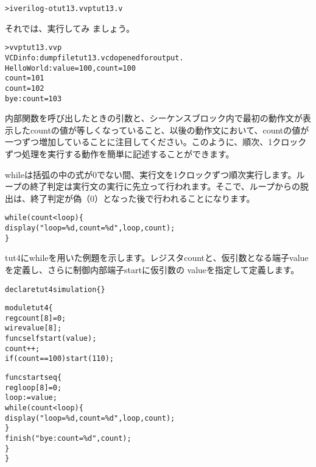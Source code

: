 \begin{reviewcmd}
\begin{alltt}
\textgreater{} iverilog -o tut13.vvp tut13.v
\end{alltt}
\end{reviewcmd}

それでは、実行してみ ましょう。

\begin{reviewcmd}
\begin{alltt}
\textgreater{} vvp tut13.vvp
VCD info: dumpfile tut13.vcd opened for output.
Hello World: value = 100, count = 100
count = 101
count = 102
bye: count = 103
\end{alltt}
\end{reviewcmd}

内部関数を呼び出したときの引数と、シーケンスブロック内で最初の動作文が表示したcountの値が等しくなっていること、以後の動作文において、countの値が一つずつ増加していることに注目してください。このように、順次、1クロックずつ処理を実行する動作を簡単に記述することができます。

whileは括弧の中の式が0でない間、実行文を1クロックずつ順次実行します。ループの終了判定は実行文の実行に先立って行われます。そこで、ループからの脱出は、終了判定が偽（0）となった後で行われることになります。

\begin{reviewemlist}
\begin{alltt}
       while(count\textless{}loop) \{
            \textunderscore{}display("loop = \%d, count = \%d", loop, count);
       \}
\end{alltt}
\end{reviewemlist}

tut4にwhileを用いた例題を示します。レジスタcountと、仮引数となる端子valueを定義し、さらに制御内部端子startに仮引数の valueを指定して定義します。

\begin{reviewlist}
\begin{alltt}
declare tut4 simulation \{ \}

module tut4 \{
   reg count[8] = 0;
   wire value[8];
   func\textunderscore{}self  start(value);
   count++;
   if(count==100) start(110);

   func start seq \{
       reg loop[8]=0;
       loop:=value;
       while(count\textless{}loop) \{
            \textunderscore{}display("loop = \%d, count = \%d", loop, count);
       \}
       \textunderscore{}finish("bye: count = \%d", count);
   \}
\}
\end{alltt}
\end{reviewlist}


